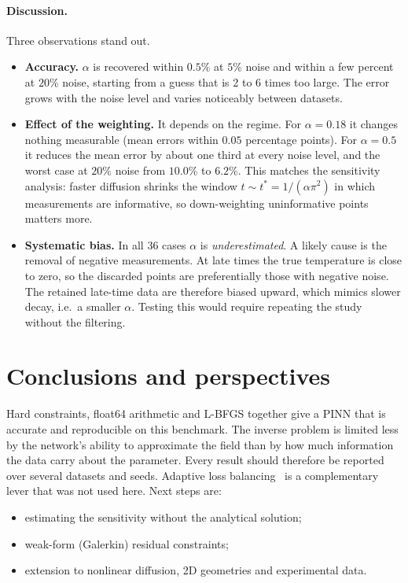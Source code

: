 \documentclass[10pt]{article}
\begin{document}
\paragraph{Discussion.} Three observations stand out.
\begin{itemize}
\item \textbf{Accuracy.} $\alpha$ is recovered within $0.5\%$ at $5\%$ noise and within a few percent at $20\%$ noise, starting from a guess that is 2 to 6 times too large. The error grows with the noise level and varies noticeably between datasets.
\item \textbf{Effect of the weighting.} It depends on the regime. For $\alpha=0.18$ it changes nothing measurable (mean errors within $0.05$ percentage points). For $\alpha=0.5$ it reduces the mean error by about one third at every noise level, and the worst case at $20\%$ noise from $10.0\%$ to $6.2\%$. This matches the sensitivity analysis: faster diffusion shrinks the window $t\sim t^\ast=1/(\alpha\pi^2)$ in which measurements are informative, so down-weighting uninformative points matters more.
\item \textbf{Systematic bias.} In all 36 cases $\alpha$ is \emph{underestimated}. A likely cause is the removal of negative measurements. At late times the true temperature is close to zero, so the discarded points are preferentially those with negative noise. The retained late-time data are therefore biased upward, which mimics slower decay, i.e.\ a smaller $\alpha$. Testing this would require repeating the study without the filtering.
\end{itemize}


\section{Conclusions and perspectives}
Hard constraints, float64 arithmetic and L-BFGS together give a PINN that is accurate and reproducible on this benchmark. The inverse problem is limited less by the network's ability to approximate the field than by how much information the data carry about the parameter. Every result should therefore be reported over several datasets and seeds. Adaptive loss balancing~\cite{wang2021} is a complementary lever that was not used here. Next steps are:
\begin{itemize}
\item estimating the sensitivity without the analytical solution;
\item weak-form (Galerkin) residual constraints;
\item extension to nonlinear diffusion, 2D geometries and experimental data.
\end{itemize}
\end{document}
